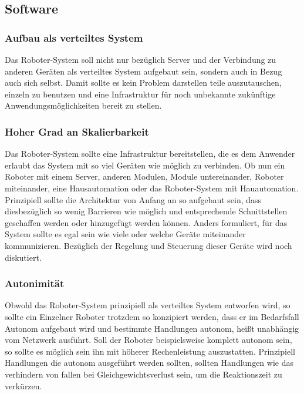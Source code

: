 \documentclass[11pt]{amsart}
\begin{document}
\subsection{Software}
\subsubsection{Aufbau als verteiltes System}
Das Roboter-System soll nicht nur bez\"uglich Server und der Verbindung zu anderen Ger\"aten als verteiltes System aufgebaut sein, sondern auch in Bezug auch sich selbst. Damit sollte es kein Problem darstellen teile auszutauschen, einzeln zu benutzen und eine Infrastruktur f\"ur noch unbekannte zuk\"unftige Anwendungsm\"oglichkeiten bereit zu stellen.
\subsubsection{Hoher Grad an Skalierbarkeit}
Das Roboter-System sollte eine Infrastruktur bereitstellen, die es dem Anwender erlaubt das System mit so viel Ger\"aten wie m\"oglich zu verbinden. Ob nun ein Roboter mit einem Server, anderen Modulen, Module untereinander, Roboter miteinander, eine Hausautomation oder das Roboter-System mit Hauautomation. Prinzipiell sollte die Architektur von Anfang an so aufgebaut sein, dass diesbez\"uglich so wenig Barrieren wie m\"oglich und entsprechende Schnittstellen geschaffen werden oder hinzugef\"ugt werden k\"onnen. Anders formuliert, f\"ur das System sollte es egal sein wie viele oder welche Ger\"ate miteinander kommunizieren. Bez\"uglich der Regelung und Steuerung dieser Ger\"ate wird noch diskutiert.
\subsubsection{Autonimit\"at}
Obwohl das Roboter-System prinzipiell als verteiltes System entworfen wird, so sollte ein Einzelner Roboter trotzdem so konzipiert werden, dass er im Bedarfsfall Autonom aufgebaut wird und bestimmte Handlungen autonom, hei\ss{}t unabh\"angig vom Netzwerk ausf\"uhrt. Soll der Roboter beispielsweise komplett autonom sein, so sollte es m\"oglich sein ihn mit h\"oherer Rechenleistung auszustatten. Prinzipiell Handlungen die autonom ausgef\"uhrt werden sollten, sollten Handlungen wie das verhindern von fallen bei Gleichgewichtsverlust sein, um die Reaktionszeit zu verk\"urzen. 
\end{document}
